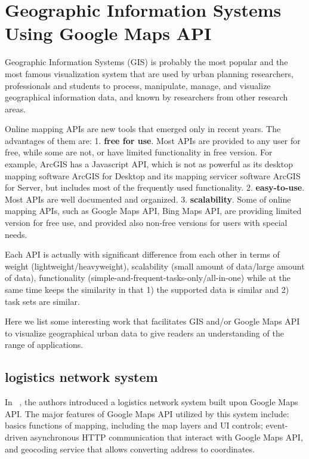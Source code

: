 \documentclass{egpubl}
\begin{document}
\section{Geographic Information Systems Using Google Maps API}

Geographic Information Systems (GIS) is probably the most popular and the most famous visualization system that are used by urban planning researchers, professionals and students to process, manipulate, manage, and visualize geographical information data, and known by researchers from other research areas.

Online mapping APIs are new tools that emerged only in recent years. The advantages of them are: 1. \textbf{free for use}. Most APIs are provided to any user for free, while some are not, or have limited functionality in free version. For example, ArcGIS has a Javascript API, which is not as powerful as its desktop mapping software ArcGIS for Desktop and its mapping servicer software ArcGIS for Server, but includes most of the frequently used functionality. 2. \textbf{easy-to-use}. Most APIs are well documented and organized. 3. \textbf{scalability}. Some of online mapping APIs, such as Google Maps API, Bing Maps API, are providing limited version for free use, and provided also non-free versions for users with special needs.

Each API is actually with significant difference from each other in terms of weight (lightweight/heavyweight), scalability (small amount of data/large amount of data), functionality (simple-and-frequent-tasks-only/all-in-one) while at the same time keeps the similarity in that 1) the supported data is similar and 2) task sets are similar.

Here we list some interesting work that facilitates GIS and/or Google Maps API to visualize geographical urban data to give readers an understanding of the range of applications.

\subsection{logistics network system}
In ~\cite{fu2010logistics}, the authors introduced a logistics network system built upon Google Maps API. The major features of Google Maps API utilized by this system include: basics functions of mapping, including the map layers and UI controls; event-driven asynchronous HTTP communication that interact with Google Maps API, and geocoding service that allows converting address to coordinates.
\end{document}
